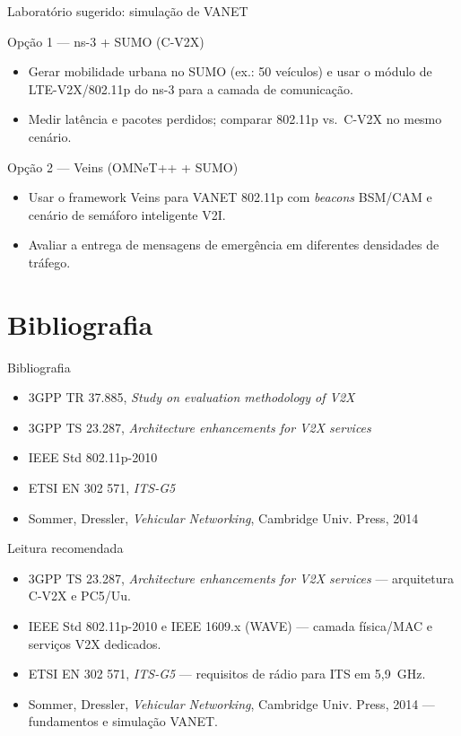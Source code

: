 \documentclass[aspectratio=169,11pt]{beamer}
\begin{document}
\begin{frame}{Laboratório sugerido: simulação de VANET}
  \begin{block}{Opção 1 --- ns-3 + SUMO (C-V2X)}
    \begin{itemize}
      \item Gerar mobilidade urbana no SUMO (ex.: 50 veículos) e usar o módulo de LTE-V2X/802.11p do ns-3 para a camada de comunicação.
      \item Medir latência e pacotes perdidos; comparar 802.11p vs.\ C-V2X no mesmo cenário.
    \end{itemize}
  \end{block}
  \begin{block}{Opção 2 --- Veins (OMNeT++ + SUMO)}
    \begin{itemize}
      \item Usar o framework Veins para VANET 802.11p com \emph{beacons} BSM/CAM e cenário de semáforo inteligente V2I.
      \item Avaliar a entrega de mensagens de emergência em diferentes densidades de tráfego.
    \end{itemize}
  \end{block}
\end{frame}

\section{Bibliografia}

\begin{frame}{Bibliografia}
  \begin{itemize}
    \item 3GPP TR 37.885, \emph{Study on evaluation methodology of V2X}
    \item 3GPP TS 23.287, \emph{Architecture enhancements for V2X services}
    \item IEEE Std 802.11p-2010
    \item ETSI EN 302 571, \emph{ITS-G5}
    \item Sommer, Dressler, \emph{Vehicular Networking}, Cambridge Univ. Press, 2014
  \end{itemize}
\end{frame}

\begin{frame}{Leitura recomendada}
  \begin{itemize}
    \item 3GPP TS 23.287, \emph{Architecture enhancements for V2X services} --- arquitetura C-V2X e PC5/Uu.
    \item IEEE Std 802.11p-2010 e IEEE 1609.x (WAVE) --- camada física/MAC e serviços V2X dedicados.
    \item ETSI EN 302 571, \emph{ITS-G5} --- requisitos de rádio para ITS em 5,9~GHz.
    \item Sommer, Dressler, \emph{Vehicular Networking}, Cambridge Univ. Press, 2014 --- fundamentos e simulação VANET.
  \end{itemize}
\end{frame}
\end{document}
